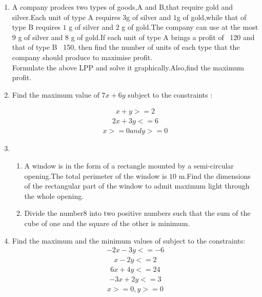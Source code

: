 \documentclass{article}
\begin{document}
\begin{enumerate} 
 \item A company prodces two types of goods,A and B,that require gold and silver.Each unit of type A requires $3$g of silver and $1$g of gold,while that of type B requires $1$ g of silver and $2$ g of gold.The company can use at the most $9$ g of silver and $8$ g of gold.If each unit of  type A brings a profit of \rupee~120 and that of type B \rupee~150, then find the number of units of each type that the company should produce to maximise profit.\\
		Formulate the above LPP and solve it graphically.Also,find the maximum profit.
\item Find the maximum value of $7x+6y$ subject to the constraints :

		\begin{align}
		            x+y>=2
		\end{align}
		\begin{align}
			    2x+3y<=6
		\end{align}
		\begin{align}
			    x>=0 and y>=0
		\end{align}
\item \begin{enumerate} %
			\item A window is in the form of a rectangle mounted by a semi-circular opening.The total perimeter of the window is $10$ m.Find the dimensions of the rectangular part of the window to admit maximum light through the whole opening.
			\item Divide the number$8$ into two positive numbers such that the sum of the cube of one and the square of the other is minimum.
	               \end{enumerate}
\item 
 Find the maximum and the minimum values of  subject to the constraints:
	\\
	\begin{align}
		-2x-3y<=-6
	\end{align}
	\begin{align} 
		x-2y<=2
	\end{align}
	\begin{align}
		 6x+4y<=24
        \end{align}
	\begin{align}
		-3x+2y<=3
	\end{align}
	\begin{align}
		x>=0,y>=0
	\end{align}

\end{enumerate}
\end{document}
